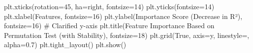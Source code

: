 \documentclass[
  letterpaper,
  DIV=11,
  numbers=noendperiod]{scrreprt}
\newenvironment{Shaded}{\begin{snugshade}}{\end{snugshade}}
\newcommand{\CommentTok}[1]{\textcolor[rgb]{0.37,0.37,0.37}{#1}}
\newcommand{\DecValTok}[1]{\textcolor[rgb]{0.68,0.00,0.00}{#1}}
\newcommand{\FloatTok}[1]{\textcolor[rgb]{0.68,0.00,0.00}{#1}}
\newcommand{\NormalTok}[1]{\textcolor[rgb]{0.00,0.23,0.31}{#1}}
\newcommand{\OperatorTok}[1]{\textcolor[rgb]{0.37,0.37,0.37}{#1}}
\newcommand{\StringTok}[1]{\textcolor[rgb]{0.13,0.47,0.30}{#1}}
\newcommand{\VariableTok}[1]{\textcolor[rgb]{0.07,0.07,0.07}{#1}}
\begin{document}
\begin{Shaded}
\begin{Highlighting}[]
\NormalTok{plt.xticks(rotation}\OperatorTok{=}\DecValTok{45}\NormalTok{, ha}\OperatorTok{=}\StringTok{\textquotesingle{}right\textquotesingle{}}\NormalTok{, fontsize}\OperatorTok{=}\DecValTok{14}\NormalTok{)}
\NormalTok{plt.yticks(fontsize}\OperatorTok{=}\DecValTok{14}\NormalTok{)}
\NormalTok{plt.xlabel(}\StringTok{\textquotesingle{}Features\textquotesingle{}}\NormalTok{, fontsize}\OperatorTok{=}\DecValTok{16}\NormalTok{)}
\NormalTok{plt.ylabel(}\StringTok{\textquotesingle{}Importance Score (Decrease in R²)\textquotesingle{}}\NormalTok{, fontsize}\OperatorTok{=}\DecValTok{16}\NormalTok{) }\CommentTok{\# Clarified y{-}axis}
\NormalTok{plt.title(}\StringTok{\textquotesingle{}Feature Importance Based on Permutation Test (with Stability)\textquotesingle{}}\NormalTok{, fontsize}\OperatorTok{=}\DecValTok{18}\NormalTok{)}
\NormalTok{plt.grid(}\VariableTok{True}\NormalTok{, axis}\OperatorTok{=}\StringTok{\textquotesingle{}y\textquotesingle{}}\NormalTok{, linestyle}\OperatorTok{=}\StringTok{\textquotesingle{}{-}{-}\textquotesingle{}}\NormalTok{, alpha}\OperatorTok{=}\FloatTok{0.7}\NormalTok{)}
\NormalTok{plt.tight\_layout()}
\NormalTok{plt.show()}
\end{Highlighting}
\end{Shaded}
\end{document}
